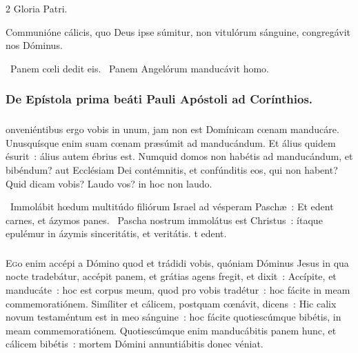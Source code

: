 \documentclass[9pt,twoside]{extarticle}
\begin{document}
\begin{multicols}{2}
Gloria Patri.

\begin{tightlist}{}
\item {} Communióne cálicis, quo Deus ipse súmitur, non vitulórum sánguine, congregávit nos Dóminus.
\item {}~Panem cœli dedit eis. ~Panem Angelórum manducávit homo.
\item {}
\end{tightlist}

\subsubsection*{\center De Epístola prima beáti Pauli Apóstoli ad Corínthios.}
\subsubsection*{\center {}}
onveniéntibus ergo vobis in unum, jam non est Domínicam cœnam manducáre. Unusquísque enim suam cœnam præsúmit ad manducándum. Et álius quidem ésurit~: álius autem ébrius est. Numquid domos non habétis ad manducándum, et bibéndum? aut Ecclésiam Dei contémnitis, et confúnditis eos, qui non habent? Quid dicam vobis? Laudo vos? in hoc non laudo.

\begin{tightlist}{}
\item {}~Immolábit hœdum multitúdo filiórum Israel ad vésperam Paschæ~: \textred{*} Et edent carnes, et ázymos panes. ~Pascha nostrum immolátus est Christus~: ítaque epulémur in ázymis sinceritátis, et veritátis. t edent.
\end{tightlist}

\subsubsection*{\center{}}
\lettrine{E}go enim accépi a Dómino quod et trádidi vobis, quóniam Dóminus Jesus in qua nocte tradebátur, accépit panem, et grátias agens fregit, et dixit~: Accípite, et manducáte~: hoc est corpus meum, quod pro vobis tradétur~: hoc fácite in meam commemoratiónem. Simíliter et cálicem, postquam cœnávit, dicens~: Hic calix novum testaméntum est in meo sánguine~: hoc fácite quotiescúmque bibétis, in meam commemoratiónem. Quotiescúmque enim manducábitis panem hunc, et cálicem bibétis~: mortem Dómini annuntiábitis donec véniat.


\end{multicols}
\end{document}
